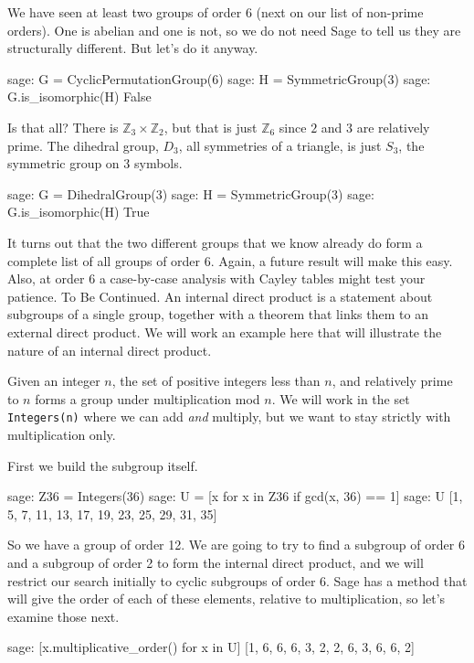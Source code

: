 %
We have seen at least two groups of order $6$ (next on our list of non-prime orders).  One is abelian and one is not, so we do not need Sage to tell us they are structurally different.  But let's do it anyway.
%
\begin{sageexample}
sage: G = CyclicPermutationGroup(6)
sage: H = SymmetricGroup(3)
sage: G.is_isomorphic(H)
False
\end{sageexample}
%
Is that all?  There is ${\mathbb Z}_3\times{\mathbb Z}_2$, but that is just ${\mathbb Z}_6$ since $2$ and $3$ are relatively prime.  The dihedral group, $D_3$, all symmetries of a triangle, is just $S_3$, the symmetric group on $3$ symbols.
%
\begin{sageexample}
sage: G = DihedralGroup(3)
sage: H = SymmetricGroup(3)
sage: G.is_isomorphic(H)
True
\end{sageexample}
%
It turns out that the two different groups that we know already do form a complete list of all groups of order $6$.  Again, a future result will make this easy.  Also, at order $6$ a case-by-case analysis with Cayley tables might test your patience.  To Be Continued.
%
%
An internal direct product is a statement about subgroups of a single group, together with a theorem that links them to an external direct product.  We will work an example here that will illustrate the nature of an internal direct product.\par
%
Given an integer $n$, the set of positive integers less than $n$, and relatively prime to $n$ forms a group under multiplication mod $n$.  We will work in the set \verb?Integers(n)? where we can add \emph{and} multiply, but we want to stay strictly with multiplication only.\par
%
First we build the subgroup itself.
%
\begin{sageexample}
sage: Z36 = Integers(36)
sage: U = [x for x in Z36 if gcd(x, 36) == 1]
sage: U
[1, 5, 7, 11, 13, 17, 19, 23, 25, 29, 31, 35]
\end{sageexample}
%
So we have a group of order 12.  We are going to try to find a subgroup of order 6 and a subgroup of order 2 to form the internal direct product, and we will restrict our search initially to cyclic subgroups of order 6.  Sage has a method that will give the order of each of these elements, relative to multiplication, so let's examine those next.
%
\begin{sageexample}
sage: [x.multiplicative_order() for x in U]
[1, 6, 6, 6, 3, 2, 2, 6, 3, 6, 6, 2]
\end{sageexample}
